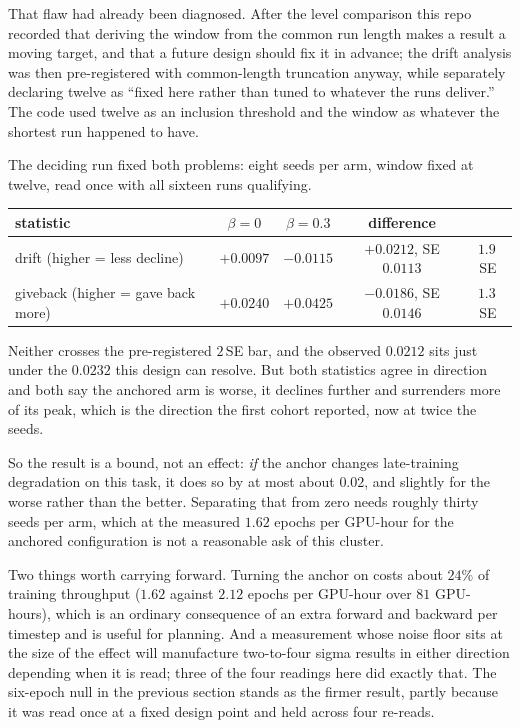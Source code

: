 \documentclass[11pt]{article}
\begin{document}
That flaw had already been diagnosed. After the level comparison this repo recorded that deriving the window from the common run length makes a result a moving target, and that a future design should fix it in advance; the drift analysis was then pre-registered with common-length truncation anyway, while separately declaring twelve as ``fixed here rather than tuned to whatever the runs deliver.'' The code used twelve as an inclusion threshold and the window as whatever the shortest run happened to have.

The deciding run fixed both problems: eight seeds per arm, window fixed at twelve, read once with all sixteen runs qualifying.

\begin{center}
\begin{tabular}{lcccc}
\toprule
statistic & $\beta{=}0$ & $\beta{=}0.3$ & difference & \\
\midrule
drift (higher = less decline) & $+0.0097$ & $-0.0115$ & $+0.0212$, SE $0.0113$ & $1.9$\,SE \\
giveback (higher = gave back more) & $+0.0240$ & $+0.0425$ & $-0.0186$, SE $0.0146$ & $1.3$\,SE \\
\bottomrule
\end{tabular}
\end{center}

\noindent Neither crosses the pre-registered $2$\,SE bar, and the observed $0.0212$ sits just under the $0.0232$ this design can resolve. But both statistics agree in direction and both say the anchored arm is worse, it declines further and surrenders more of its peak, which is the direction the first cohort reported, now at twice the seeds.

So the result is a bound, not an effect: \emph{if} the anchor changes late-training degradation on this task, it does so by at most about $0.02$, and slightly for the worse rather than the better. Separating that from zero needs roughly thirty seeds per arm, which at the measured $1.62$ epochs per GPU-hour for the anchored configuration is not a reasonable ask of this cluster.

Two things worth carrying forward. Turning the anchor on costs about $24\%$ of training throughput ($1.62$ against $2.12$ epochs per GPU-hour over $81$ GPU-hours), which is an ordinary consequence of an extra forward and backward per timestep and is useful for planning. And a measurement whose noise floor sits at the size of the effect will manufacture two-to-four sigma results in either direction depending when it is read; three of the four readings here did exactly that. The six-epoch null in the previous section stands as the firmer result, partly because it was read once at a fixed design point and held across four re-reads.
\end{document}
